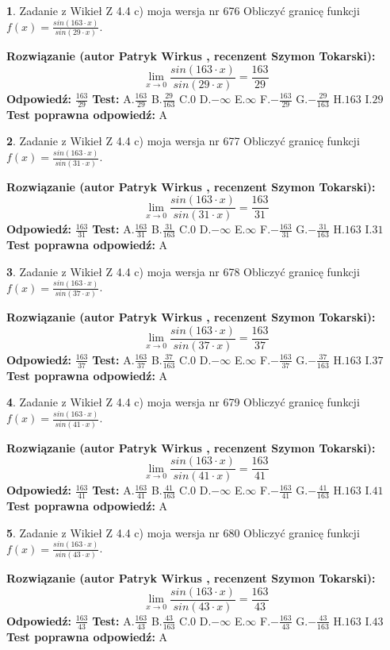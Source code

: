 \documentclass[12pt, a4paper]{article}
\theoremstyle{definition} %
\newtheorem{zad}{}
\newcommand{\zadStart}[1]{\begin{zad}#1\newline}
\newcommand{\zadStop}{\end{zad}}
\newcommand{\rozwStart}[2]{\noindent \textbf{Rozwiązanie (autor #1 , recenzent #2): }\newline}
\newcommand{\rozwStop}{\newline}
\newcommand{\odpStart}{\noindent \textbf{Odpowiedź:}\newline}
\newcommand{\odpStop}{\newline}
\newcommand{\testStart}{\noindent \textbf{Test:}\newline}
\newcommand{\testStop}{\newline}
\newcommand{\kluczStart}{\noindent \textbf{Test poprawna odpowiedź:}\newline}
\newcommand{\kluczStop}{\newline}
\begin{document}
\zadStart{Zadanie z Wikieł Z 4.4 c) moja wersja nr 676}
Obliczyć granicę funkcji $f(x)=\frac{sin(163\cdot x)}{sin(29\cdot x)}$.
\zadStop
\rozwStart{Patryk Wirkus}{Szymon Tokarski}
$$\lim\limits_{x\to 0}\frac{sin(163\cdot x)}{sin(29\cdot x)}=
\frac{163}{29}$$
\rozwStop
\odpStart
$\frac{163}{29}$
\odpStop
\testStart
A.$\frac{163}{29}$
B.$\frac{29}{163}$
C.$0$
D.$-\infty$
E.$\infty$
F.$-\frac{163}{29}$
G.$-\frac{29}{163}$
H.$163$
I.$29$
\testStop
\kluczStart
A
\kluczStop



\zadStart{Zadanie z Wikieł Z 4.4 c) moja wersja nr 677}
Obliczyć granicę funkcji $f(x)=\frac{sin(163\cdot x)}{sin(31\cdot x)}$.
\zadStop
\rozwStart{Patryk Wirkus}{Szymon Tokarski}
$$\lim\limits_{x\to 0}\frac{sin(163\cdot x)}{sin(31\cdot x)}=
\frac{163}{31}$$
\rozwStop
\odpStart
$\frac{163}{31}$
\odpStop
\testStart
A.$\frac{163}{31}$
B.$\frac{31}{163}$
C.$0$
D.$-\infty$
E.$\infty$
F.$-\frac{163}{31}$
G.$-\frac{31}{163}$
H.$163$
I.$31$
\testStop
\kluczStart
A
\kluczStop



\zadStart{Zadanie z Wikieł Z 4.4 c) moja wersja nr 678}
Obliczyć granicę funkcji $f(x)=\frac{sin(163\cdot x)}{sin(37\cdot x)}$.
\zadStop
\rozwStart{Patryk Wirkus}{Szymon Tokarski}
$$\lim\limits_{x\to 0}\frac{sin(163\cdot x)}{sin(37\cdot x)}=
\frac{163}{37}$$
\rozwStop
\odpStart
$\frac{163}{37}$
\odpStop
\testStart
A.$\frac{163}{37}$
B.$\frac{37}{163}$
C.$0$
D.$-\infty$
E.$\infty$
F.$-\frac{163}{37}$
G.$-\frac{37}{163}$
H.$163$
I.$37$
\testStop
\kluczStart
A
\kluczStop



\zadStart{Zadanie z Wikieł Z 4.4 c) moja wersja nr 679}
Obliczyć granicę funkcji $f(x)=\frac{sin(163\cdot x)}{sin(41\cdot x)}$.
\zadStop
\rozwStart{Patryk Wirkus}{Szymon Tokarski}
$$\lim\limits_{x\to 0}\frac{sin(163\cdot x)}{sin(41\cdot x)}=
\frac{163}{41}$$
\rozwStop
\odpStart
$\frac{163}{41}$
\odpStop
\testStart
A.$\frac{163}{41}$
B.$\frac{41}{163}$
C.$0$
D.$-\infty$
E.$\infty$
F.$-\frac{163}{41}$
G.$-\frac{41}{163}$
H.$163$
I.$41$
\testStop
\kluczStart
A
\kluczStop



\zadStart{Zadanie z Wikieł Z 4.4 c) moja wersja nr 680}
Obliczyć granicę funkcji $f(x)=\frac{sin(163\cdot x)}{sin(43\cdot x)}$.
\zadStop
\rozwStart{Patryk Wirkus}{Szymon Tokarski}
$$\lim\limits_{x\to 0}\frac{sin(163\cdot x)}{sin(43\cdot x)}=
\frac{163}{43}$$
\rozwStop
\odpStart
$\frac{163}{43}$
\odpStop
\testStart
A.$\frac{163}{43}$
B.$\frac{43}{163}$
C.$0$
D.$-\infty$
E.$\infty$
F.$-\frac{163}{43}$
G.$-\frac{43}{163}$
H.$163$
I.$43$
\testStop
\kluczStart
A
\kluczStop
\end{document}
